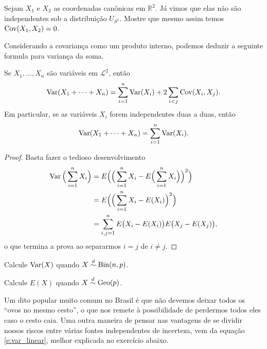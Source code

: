 \begin{exercise}
  Sejam $X_1$ e $X_2$ as coordenadas canônicas em $\mathbb{R}^2$.
  Já vimos que elas não são independentes sob a distribuição $U_{S^1}$.
  Mostre que mesmo assim temos $\operatorname{Cov}(X_1, X_2) = 0$.
\end{exercise}

Considerando a covariança como um produto interno, podemos deduzir a seguinte formula para variança da soma.

\begin{proposition}
  Se $X_1, \dots, X_n$ são variáveis em $\mathcal{L}^2$, então
  \begin{equation}
    \operatorname{Var}(X_1 + \dots + X_n) = \sum_{i=1}^n \operatorname{Var}(X_i) + 2\sum_{i < j} \operatorname{Cov}(X_i, X_j).
  \end{equation}
  Em particular, se as variáveis $X_i$ forem independentes duas a duas, então
  \begin{equation}
    \label{e:var_linear}
    \operatorname{Var}(X_1 + \dots + X_n) = \sum_{i=1}^n \operatorname{Var}(X_i).
  \end{equation}
\end{proposition}


\begin{proof}
  Basta fazer o tedioso desenvolvimento
  \begin{equation}
    \begin{split}
      \operatorname{Var}\Big( \sum_{i=1}^n X_i\Big) & = E \Big( \Big( \sum_{i=1}^n X_i - E\Big( \sum_{i=1}^n X_i\Big)\Big)^2\Big)\\
      & = E \Big( \Big( \sum_{i=1}^n X_i - E(X_i)\Big)^2\Big)\\
      & = \sum_{i, j = 1}^n E \big(X_i - E(X_i)\big) E\big(X_j - E(X_j)\big),
    \end{split}
  \end{equation}
  o que termina a prova ao separarmos $i = j$ de $i \neq j$.
\end{proof}


\begin{exercise}
  Calcule $\operatorname{Var}(X)$ quando $X \overset{d}\sim \operatorname{Bin}(n, p)$.
\end{exercise}

\begin{exercise}
  Calcule $E(X)$ quando $X \overset{d}\sim \operatorname{Geo}(p)$.
\end{exercise}

Um dito popular muito comum no Brasil é que não devemos deixar todos os ``ovos no mesmo cesto'', o que nos remete à possibilidade de perdermos todos eles caso o cesto caia.
Uma outra maneira de pensar nas vantagens de se dividir nossos riscos entre várias fontes independentes de incerteza, vem da equação \eqref{e:var_linear}, melhor explicada no exercício abaixo.

